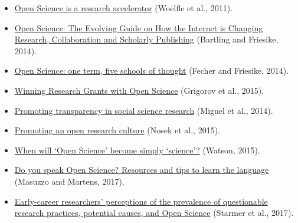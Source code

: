 \documentclass[]{book}
\begin{document}
\begin{itemize}
\item
  \href{https://github.com/OpenScienceMOOC/Module-1-Open-Principles/blob/master/Reading\%20Material_Open\%20Principles/Woelfle\%20et\%20al.\%2C\%202011.pdf}{Open Science is a research accelerator} (Woelfle et al., 2011).
\item
  \href{https://github.com/OpenScienceMOOC/Module-1-Open-Principles/blob/master/Reading\%20Material_Open\%20Principles/Bartling\%20and\%20Friesike\%2C\%202014.pdf}{Open Science: The Evolving Guide on How the Internet is Changing Research, Collaboration and Scholarly Publishing} (Bartling and Friesike, 2014).
\item
  \href{https://github.com/OpenScienceMOOC/Module-1-Open-Principles/blob/master/Reading\%20Material_Open\%20Principles/Fecher\%20and\%20Friesike\%2C\%202014.pdf}{Open Science: one term, five schools of thought} (Fecher and Friesike, 2014).
\item
  \href{https://github.com/OpenScienceMOOC/Module-1-Open-Principles/blob/master/Reading\%20Material_Open\%20Principles/Grigorov\%20et\%20al.\%2C\%202015.pdf}{Winning Research Grants with Open Science} (Grigorov et al., 2015).
\item
  \href{https://github.com/OpenScienceMOOC/Module-1-Open-Principles/blob/master/Reading\%20Material_Open\%20Principles/Miguel\%20et\%20al.\%2C\%202014.pdf}{Promoting transparency in social science research} (Miguel et al., 2014).
\item
  \href{https://github.com/OpenScienceMOOC/Module-1-Open-Principles/blob/master/Reading\%20Material_Open\%20Principles/Nosek\%20et\%20al.\%2C\%202015.pdf}{Promoting an open research culture} (Nosek et al., 2015).
\item
  \href{https://github.com/OpenScienceMOOC/Module-1-Open-Principles/blob/master/Reading\%20Material_Open\%20Principles/Watson\%2C\%202015.pdf}{When will `Open Science' become simply `science'?} (Watson, 2015).
\item
  \href{https://github.com/OpenScienceMOOC/Module-1-Open-Principles/blob/master/Reading\%20Material_Open\%20Principles/Masuzzo\%20and\%20Martens\%2C\%202017.pdf}{Do you speak Open Science? Resources and tips to learn the language} (Masuzzo and Martens, 2017).
\item
  \href{https://github.com/OpenScienceMOOC/Module-1-Open-Principles/blob/master/Reading\%20Material_Open\%20Principles/St\%C3\%BCrmer\%20et\%20al.\%2C\%202017.pdf}{Early-career researchers' perceptions of the prevalence of questionable research practices, potential causes, and Open Science} (Starmer et al., 2017).

\end{itemize}
\end{document}
